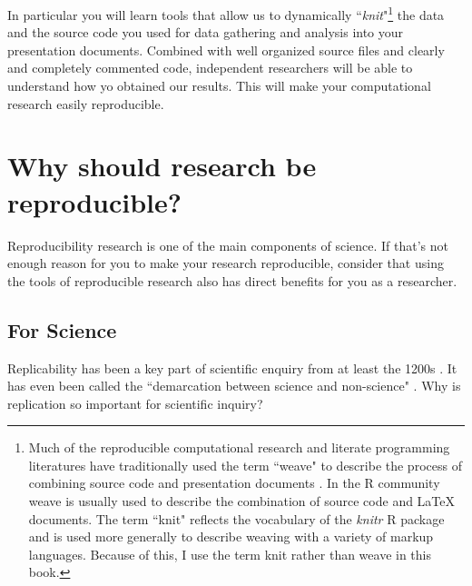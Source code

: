 In particular you will learn tools that allow us to dynamically ``{\emph{knit}}"\footnote{Much of the reproducible computational research and literate programming literatures have traditionally used the term ``weave" to describe the process of combining source code and presentation documents \cite[see][101]{Knuth1992}. In the R community weave is usually used to describe the combination of source code and LaTeX documents. The term ``knit" reflects the vocabulary of the {\emph{knitr}} R package and is used more generally to describe weaving with a variety of markup languages. Because of this, I use the term knit rather than weave in this book.} the data and the source code you used for data gathering and analysis into your presentation documents. Combined with well organized source files and clearly and completely commented code, independent researchers will be able to understand how yo obtained our results. This will make your computational research easily reproducible.


\section{Why should research be reproducible?}

Reproducibility research is one of the main components of science. If that's not enough reason for you to make your research reproducible, consider that using the tools of reproducible research also has direct benefits for you as a researcher. 

\subsection{For Science}

Replicability has been a key part of scientific enquiry from at least the 1200s \cite[]{Bacon1267,Nosek2012}. It has even been called the ``demarcation between science and non-science" \cite[2]{Braude1979}. Why is replication so important for scientific inquiry? 

